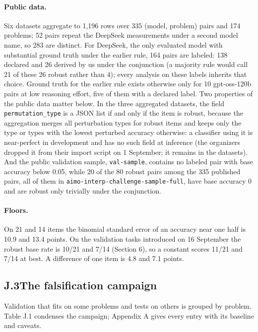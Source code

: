 \paragraph{Public data.}
Six datasets aggregate to 1,196 rows over 335 (model, problem) pairs and 174 problems; 52 pairs repeat the DeepSeek measurements under a second model name, so 283 are distinct. For DeepSeek, the only evaluated model with substantial ground truth under the earlier rule, 164 pairs are labeled: 138 declared and 26 derived by us under the conjunction (a majority rule would call 21 of these 26 robust rather than 4); every analysis on these labels inherits that choice. Ground truth for the earlier rule exists otherwise only for 10 gpt-oss-120b pairs at low reasoning effort, five of them with a declared label. Two properties of the public data matter below. In the three aggregated datasets, the field \texttt{permutation\_type} is a JSON list if and only if the item is robust, because the aggregation merges all perturbation types for robust items and keeps only the type or types with the lowest perturbed accuracy otherwise: a classifier using it is near-perfect in development and has no such field at inference (the organizers dropped it from their import script on 1 September; it remains in the datasets). And the public validation sample, \texttt{val-sample}, contains no labeled pair with base accuracy below 0.05, while 20 of the 80 robust pairs among the 335 published pairs, all of them in \texttt{aimo-interp-challenge-sample-full}, have base accuracy 0 and are robust only trivially under the conjunction.

\paragraph{Floors.}
On 21 and 14 items the binomial standard error of an accuracy near one half is 10.9 and 13.4 points. On the validation tasks introduced on 16 September the robust base rate is 10/21 and 7/14 (Section 6), so a constant scores 11/21 and 7/14 at best. A difference of one item is 4.8 and 7.1 points.

\subsection*{J.3\quad The falsification campaign}

Validation that fits on some problems and tests on others is grouped by problem. Table J.1 condenses the campaign; Appendix A gives every entry with its baseline and caveats.

